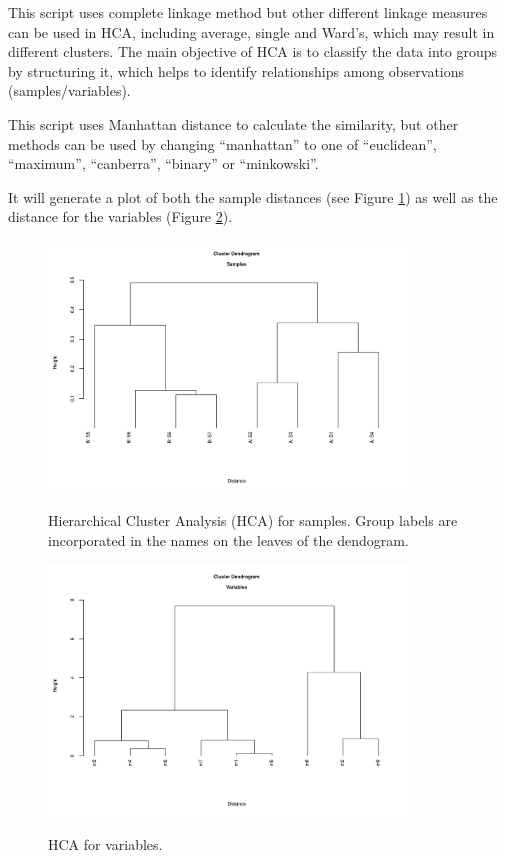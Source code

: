 \documentclass[english,a4paper,12pt]{article}
\begin{document}
This script uses complete linkage method but other different linkage measures can be used in HCA, including average, single and Ward's, which may result in different clusters.  The main objective of HCA is to classify the data into groups by structuring it, which helps to identify relationships among observations (samples/variables).

This script uses Manhattan distance to calculate the similarity, but other methods can be used by changing \textsf{``manhattan''} to one of \textsf{``euclidean''}, \textsf{``maximum''}, \textsf{``canberra''}, \textsf{``binary''} or \textsf{``minkowski''}.

It will generate a plot of both the sample distances (see Figure \ref{fig:HCA_smpl}) as well as the distance for the variables (Figure \ref{fig:HCA_var}).

\begin{figure}[h!tb]
\centering
\includegraphics[width=0.85\textwidth]{images/HCA_smpl.png} \\
\caption[HCA - Samples]{Hierarchical Cluster Analysis (HCA) for samples. Group labels are incorporated in the names on the leaves of the dendogram.}
\label{fig:HCA_smpl}
\end{figure}

\begin{figure}[h!tb]
\centering
\includegraphics[width=0.85\textwidth]{images/HCA_var.png} \\
\caption[HCA - Variables]{HCA for variables.}
\label{fig:HCA_var}
\end{figure}
\end{document}
